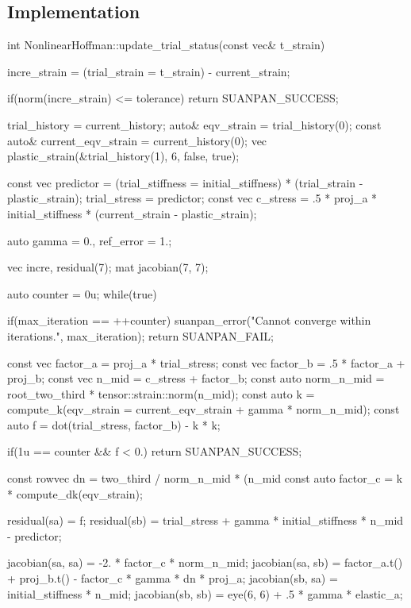 \subsection{Implementation}
\begin{cppcode}
int NonlinearHoffman::update_trial_status(const vec& t_strain) {
    incre_strain = (trial_strain = t_strain) - current_strain;

    if(norm(incre_strain) <= tolerance) return SUANPAN_SUCCESS;

    trial_history = current_history;
    auto& eqv_strain = trial_history(0);
    const auto& current_eqv_strain = current_history(0);
    vec plastic_strain(&trial_history(1), 6, false, true);

    const vec predictor = (trial_stiffness = initial_stiffness) * (trial_strain - plastic_strain);
    trial_stress = predictor;
    const vec c_stress = .5 * proj_a * initial_stiffness * (current_strain - plastic_strain);

    auto gamma = 0., ref_error = 1.;

    vec incre, residual(7);
    mat jacobian(7, 7);

    auto counter = 0u;
    while(true) {
        if(max_iteration == ++counter) {
            suanpan_error("Cannot converge within {} iterations.\n", max_iteration);
            return SUANPAN_FAIL;
        }

        const vec factor_a = proj_a * trial_stress;
        const vec factor_b = .5 * factor_a + proj_b;
        const vec n_mid = c_stress + factor_b;
        const auto norm_n_mid = root_two_third * tensor::strain::norm(n_mid);
        const auto k = compute_k(eqv_strain = current_eqv_strain + gamma * norm_n_mid);
        const auto f = dot(trial_stress, factor_b) - k * k;

        if(1u == counter && f < 0.) return SUANPAN_SUCCESS;

        const rowvec dn = two_third / norm_n_mid * (n_mid %
        const auto factor_c = k * compute_dk(eqv_strain);

        residual(sa) = f;
        residual(sb) = trial_stress + gamma * initial_stiffness * n_mid - predictor;

        jacobian(sa, sa) = -2. * factor_c * norm_n_mid;
        jacobian(sa, sb) = factor_a.t() + proj_b.t() - factor_c * gamma * dn * proj_a;
        jacobian(sb, sa) = initial_stiffness * n_mid;
        jacobian(sb, sb) = eye(6, 6) + .5 * gamma * elastic_a;

}}
\end{cppcode}

